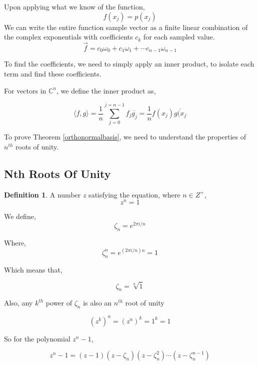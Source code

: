 \documentclass[11pt]{amsart}
\theoremstyle{definition}
\newtheorem{defn}[thm]{Definition}
\theoremstyle{remark}
\numberwithin{equation}{section}
\begin{document}
Upon applying what we know of the function,
\begin{equation*}
	f(x_j) = p(x_j)
\end{equation*}
We can write the entire function sample vector as a finite linear combination of the complex exponentials with coefficients $c_k$ for each sampled value.
\begin{equation}
	\vec{f} = c_0 \omega_0 + c_1 \omega_1 + \cdots c_{n-1} \omega_{n-1}
	\label{complexeform}
\end{equation}

To find the coefficients, we need to simply apply an inner product, to isolate each term and find these coefficients.

For vectors in $\mathbb{C}^n$, we define the inner product as,

\[
	\langle f,g \rangle = \frac{1}{n} \sum_{j = 0}^{j = n-1} f_j \overline{g_j} = \frac{1}{n} f(x_j) \overline{g(x_j}
\]

To prove Theorem \ref{orthonormalbasis}, we need to understand the properties of $n^{th}$ roots of unity.

\subsection{Nth Roots Of Unity}
\begin{defn}
A number $z$ satisfying the equation, where $n \in Z^+$,
\[
	z^n = 1
\]
\end{defn}
We define, 
\[
	\zeta_n = e^{2 \pi i/n}
\]

Where,
\[
	\zeta_n^n = e^{(2 \pi i / n)n} = 1
\]

Which means that,

\[
	\zeta_n = \sqrt[n]{1}
\]

Also, any $k^{th}$ power of $\zeta_n$ is also an $n^{th}$ root of unity

\[
	(z^k)^n = (z^n)^k = 1^k = 1
\]

So for the polynomial $z^n - 1$,

\[
		z^{n}-1 = (z-1)(z -  \zeta_n)(z-\zeta_n^2)\cdots(z - \zeta_n^{n-1}) 
\]
\end{document}
